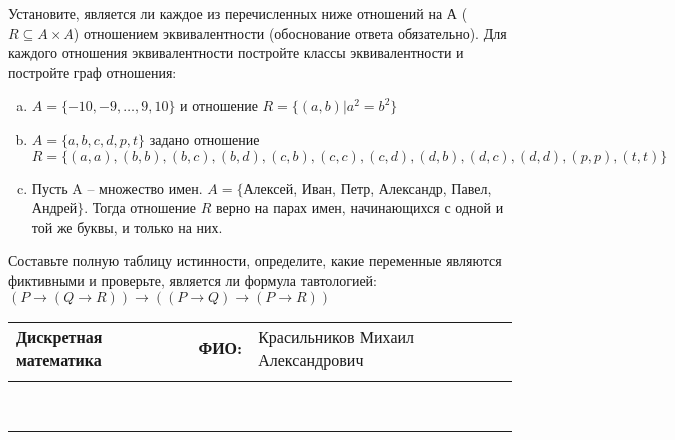 \documentclass[10pt]{exam}
\newcommand{\class}{Дискретная математика}
\newcommand{\examdate}{}
\begin{document}
\begin{questions}
\question
Установите, является ли каждое из перечисленных ниже отношений на А ($R \subseteq A \times A$) отношением эквивалентности (обоснование ответа обязательно). Для каждого отношения эквивалентности постройте классы 
эквивалентности и постройте граф отношения:
\begin{enumerate} [a)]\setcounter{enumi}{0}
\item $A = \{-10, -9, … , 9, 10\}$ и отношение $R = \{(a,b)|a^{2} = b^{2}\}$
\item $A = \{a, b, c, d, p, t\}$ задано отношение $R = \{(a, a), (b, b), (b, c), (b, d), (c, b), (c, c), (c, d), (d, b), (d, c), (d, d), (p,p), (t,t)\}$
\item Пусть A – множество имен. $A = \{ $Алексей, Иван, Петр, Александр, Павел, Андрей$ \}$. Тогда отношение $R$ верно на парах имен, начинающихся с одной и той же буквы, и только на них.
\end{enumerate}\question Составьте полную таблицу истинности, определите, какие переменные являются фиктивными и проверьте, является ли формула тавтологией:
$(P \rightarrow (Q \rightarrow R)) \rightarrow ((P \rightarrow Q) \rightarrow (P \rightarrow R))$

\end{questions}
\newpage
\begin{flushright}
\begin{tabular}{p{2.8in} r l}
\textbf{\class} & \textbf{ФИО:} &Красильников Михаил Александрович
\\

\textbf{\examdate} &&\\
\end{tabular}\\
\end{flushright}
\rule[1ex]{\textwidth}{.1pt}
\end{document}
